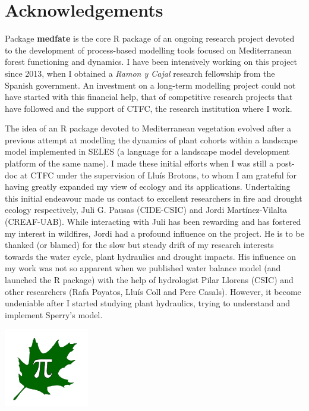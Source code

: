 \documentclass[]{book}
\begin{document}
\section*{Acknowledgements}\label{acknowledgements}

Package \textbf{medfate} is the core R package of an ongoing research
project devoted to the development of process-based modelling tools
focused on Mediterranean forest functioning and dynamics. I have been
intensively working on this project since 2013, when I obtained a
\emph{Ramon y Cajal} research fellowship from the Spanish government. An
investment on a long-term modelling project could not have started with
this financial help, that of competitive research projects that have
followed and the support of CTFC, the research institution where I work.

The idea of an R package devoted to Mediterranean vegetation evolved
after a previous attempt at modelling the dynamics of plant cohorts
within a landscape model implemented in SELES (a language for a
landscape model development platform of the same name). I made these
initial efforts when I was still a post-doc at CTFC under the
supervision of Lluís Brotons, to whom I am grateful for having greatly
expanded my view of ecology and its applications. Undertaking this
initial endeavour made us contact to excellent researchers in fire and
drought ecology respectively, Juli G. Pausas (CIDE-CSIC) and Jordi
Martínez-Vilalta (CREAF-UAB). While interacting with Juli has been
rewarding and has fostered my interest in wildfires, Jordi had a
profound influence on the project. He is to be thanked (or blamed) for
the slow but steady drift of my research interests towards the water
cycle, plant hydraulics and drought impacts. His influence on my work
was not so apparent when we published water balance model (and launched
the R package) with the help of hydrologist Pilar Llorens (CSIC) and
other researchers (Rafa Poyatos, Lluís Coll and Pere Casals). However,
it become undeniable after I started studying plant hydraulics, trying
to understand and implement Sperry's model.

\begin{center}\includegraphics[width=0.2\linewidth]{LOGO_Group} \end{center}
\end{document}
